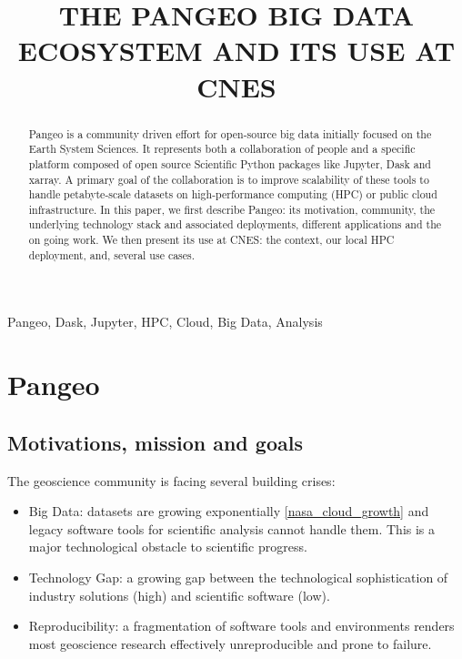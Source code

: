\documentclass{article}
\title{THE PANGEO BIG DATA ECOSYSTEM AND ITS USE AT CNES}
\begin{document}
%
\maketitle
%
\begin{abstract}
Pangeo\cite{b1} is a community driven effort for open-source big data initially focused on the Earth System Sciences. It represents both a collaboration of people and a specific platform composed of open source Scientific Python packages like Jupyter, Dask and xarray. A primary goal of the collaboration is to improve scalability of these tools to handle petabyte-scale datasets on high-performance computing (HPC) or public cloud infrastructure.
In this paper, we first describe Pangeo: its motivation, community, the underlying technology stack and associated deployments, different applications and the on going work. We then present its use at CNES: the context, our local HPC deployment, and, several use cases.
\end{abstract}
%
\begin{keywords}
Pangeo, Dask, Jupyter, HPC, Cloud, Big Data, Analysis
\end{keywords}
%
\section{Pangeo}
\label{sec:pangeo}

\subsection{Motivations, mission and goals}
\label{ssec:motivations}

The geoscience community is facing several building crises:

\begin{itemize}
\item Big Data: datasets are growing exponentially \ref{nasa_cloud_growth} and legacy software tools for scientific analysis cannot handle them. This is a major technological obstacle to scientific progress.
\item Technology Gap: a growing gap between the technological sophistication of industry solutions (high) and scientific software (low).
\item Reproducibility: a fragmentation of software tools and environments renders most geoscience research effectively unreproducible and prone to failure.
\end{itemize}
\end{document}
